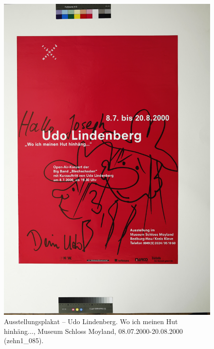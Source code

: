 \documentclass[a4paper,12pt,ngerman]{article}
\begin{document}
\newpage
\begin{figure}[ht]
\includegraphics[width=\linewidth]{Abbildung_49_(zehn1_085)}
\centering
\caption{Ausstellungsplakat – Udo Lindenberg. Wo ich meinen Hut hinhäng..., Museum Schloss Moyland, 08.07.2000-20.08.2000 (zehn1\_085).}
\end{figure}
\end{document}

